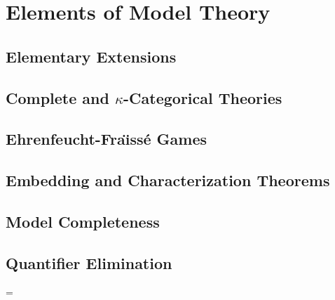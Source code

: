 \vfill\break

\section{Elements of Model Theory}

\subsection{Elementary Extensions}



\subsection{Complete and $\kappa$-Categorical Theories}



\subsection{Ehrenfeucht-Fra\"\i ss\'e Games}



\subsection{Embedding and Characterization Theorems}



\subsection{Model Completeness}



\subsection{Quantifier Elimination}



\vfill\break

\parskip=\z@
\def\currsubsection{Index}

\index

\bye

